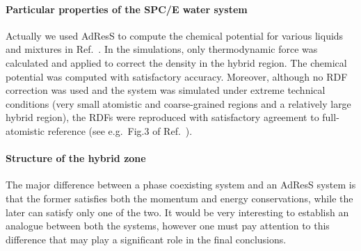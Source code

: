 \documentclass[epjST]{svjour}
\begin{document}
\paragraph{Particular properties of the SPC/E water system}
Actually we used AdResS to compute the chemical
potential for various liquids and mixtures in
Ref.~\cite{agarwal2014chemical}. In the simulations, only 
thermodynamic force was calculated and applied to correct the density
in the hybrid region. The chemical potential was computed with
satisfactory accuracy.  Moreover, although no RDF correction was used
and the system was simulated under extreme technical conditions (very
small atomistic and coarse-grained regions and a relatively large
hybrid region), the RDFs were reproduced with satisfactory
agreement to full-atomistic reference (see e.g.~Fig.3 of Ref.~\cite{agarwal2014chemical}).

\paragraph{Structure of the hybrid zone}
The major difference between a phase coexisting system and an AdResS
system is that the former satisfies both the momentum and energy
conservations, while the later can satisfy only one of the two.
It would be very interesting to establish an analogue between
both the systems, however one must pay attention
to this difference that may play a significant role in the final conclusions.



{}


\end{document}
